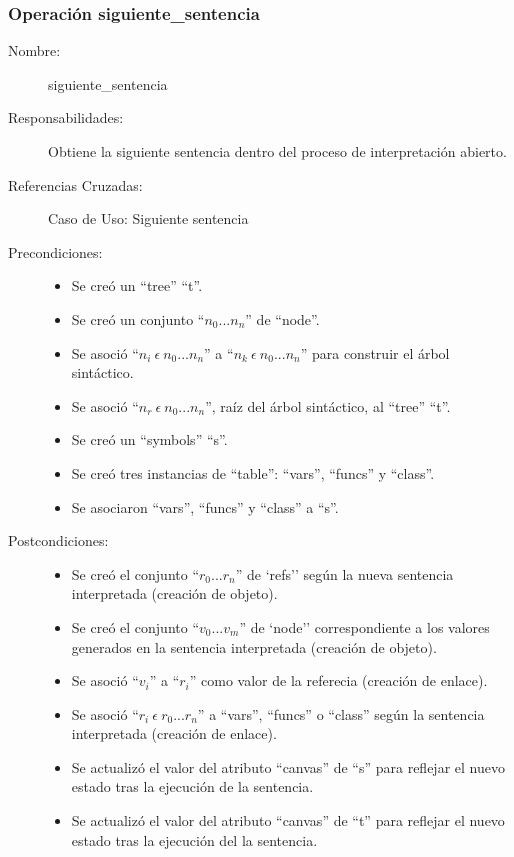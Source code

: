 \subsubsection{Operación siguiente\_sentencia}

	\begin{description}
		\item [Nombre:] siguiente\_sentencia
		\item [Responsabilidades:] Obtiene la siguiente sentencia dentro del proceso de interpretación abierto.
		\item [Referencias Cruzadas: ] Caso de Uso: Siguiente sentencia
      \item [Precondiciones:] \hfill
         \begin {itemize}
         \item Se creó un ``tree'' ``t''.
         \item Se creó un conjunto ``$n_0...n_n$'' de ``node''.
         \item Se asoció ``$n_i\ \epsilon\ n_0...n_n$'' a ``$n_k\ \epsilon\ n_0...n_n$'' para construir el árbol sintáctico.
         \item Se asoció  ``$n_r\ \epsilon\ n_0...n_n$'', raíz del árbol sintáctico, al ``tree'' ``t''.
         \item Se creó un ``symbols'' ``s''.
         \item Se creó tres instancias de ``table'': ``vars'', ``funcs'' y ``class''.
         \item Se asociaron ``vars'', ``funcs'' y ``class'' a ``s''.
      \end{itemize}
      \item [Postcondiciones:] \hfill
      \begin {itemize}
         \item Se creó el conjunto ``$r_0...r_n$'' de `refs'' según la nueva sentencia interpretada (creación de objeto).
         \item Se creó el conjunto ``$v_0...v_m$'' de `node'' correspondiente a los valores generados en la sentencia  interpretada (creación de objeto).
         \item Se asoció ``$v_i$'' a ``$r_i$'' como valor de la referecia (creación de enlace).
         \item Se asoció ``$r_i\ \epsilon \ r_0...r_n$'' a ``vars'', ``funcs'' o ``class'' según la sentencia interpretada (creación de enlace).  
         \item Se actualizó el valor del atributo ``canvas'' de ``s'' para reflejar el nuevo estado tras la ejecución de la sentencia.
         \item Se actualizó el valor del atributo ``canvas'' de ``t'' para reflejar el nuevo estado tras la ejecución del la sentencia.
      \end{itemize}
	\end{description}


